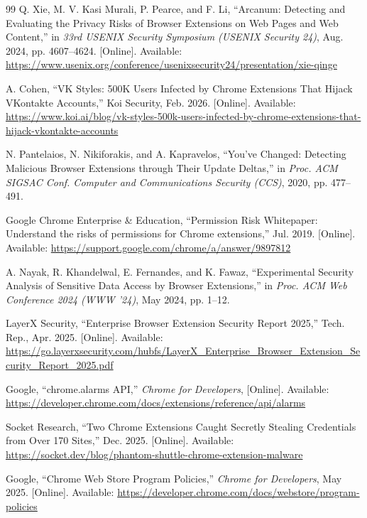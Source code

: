 \documentclass[12pt,oneside]{report}
\begin{document}
\begin{thebibliography}{99}
Q. Xie, M. V. Kasi Murali, P. Pearce, and F. Li,
``Arcanum: Detecting and Evaluating the Privacy Risks of Browser Extensions on Web Pages and Web Content,''
in \textit{33rd USENIX Security Symposium (USENIX Security 24)},
Aug. 2024, pp. 4607--4624.
[Online]. Available: \url{https://www.usenix.org/conference/usenixsecurity24/presentation/xie-qinge}

A. Cohen, 
``VK Styles: 500K Users Infected by Chrome Extensions That Hijack VKontakte Accounts,'' 
Koi Security, Feb. 2026.
[Online]. Available: \url{https://www.koi.ai/blog/vk-styles-500k-users-infected-by-chrome-extensions-that-hijack-vkontakte-accounts}

N. Pantelaios, N. Nikiforakis, and A. Kapravelos, 
``You've Changed: Detecting Malicious Browser Extensions through Their Update Deltas,'' 
in \textit{Proc. ACM SIGSAC Conf. Computer and Communications Security (CCS)}, 
2020, pp. 477--491.


Google Chrome Enterprise \& Education,
``Permission Risk Whitepaper: Understand the risks of permissions for Chrome extensions,''
Jul. 2019.
[Online]. Available: \url{https://support.google.com/chrome/a/answer/9897812}

A. Nayak, R. Khandelwal, E. Fernandes, and K. Fawaz,
``Experimental Security Analysis of Sensitive Data Access by Browser Extensions,''
in \textit{Proc. ACM Web Conference 2024 (WWW '24)}, May 2024, pp. 1--12.

LayerX Security,
``Enterprise Browser Extension Security Report 2025,''
Tech. Rep., Apr. 2025.
[Online]. Available: \url{https://go.layerxsecurity.com/hubfs/LayerX_Enterprise_Browser_Extension_Security_Report_2025.pdf}

Google,
``chrome.alarms API,''
\textit{Chrome for Developers},
[Online]. Available: \url{https://developer.chrome.com/docs/extensions/reference/api/alarms}

Socket Research,
``Two Chrome Extensions Caught Secretly Stealing Credentials from Over 170 Sites,''
Dec. 2025.
[Online]. Available: \url{https://socket.dev/blog/phantom-shuttle-chrome-extension-malware}


Google,
``Chrome Web Store Program Policies,''
\textit{Chrome for Developers}, May 2025.
[Online]. Available: \url{https://developer.chrome.com/docs/webstore/program-policies}


\end{thebibliography}
\end{document}
